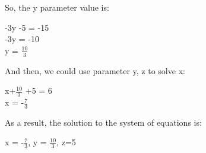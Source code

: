 \documentclass[a4paper,12pt]{article} %
\begin{document}
So, the y parameter value is: \\
\begin{center}
    -3y -5 = -15 \\ -3y = -10 \\ y = $\frac{10}{3}$
\end{center}

And then, we could use parameter y, z to solve x:
\begin{center}
x+$\frac{10}{3}$ +5 = 6 \\
x = -$\frac{7}{3}$
\end{center}

As a result,  the solution to the system of equations is:
\begin{center}
x = -$\frac{7}{3}$, y = $\frac{10}{3}$, z=5
\end{center}

\vspace{2mm}
\end{document}

